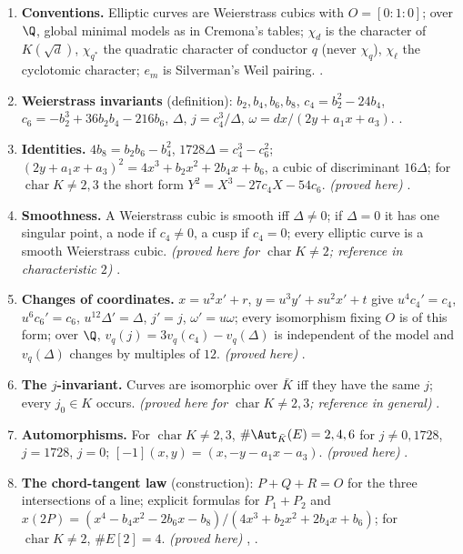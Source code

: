\begin{enumerate}[label=\textbf{\thechapter.\arabic*}]
\item \textbf{Conventions.} Elliptic curves are Weierstrass cubics with $O=[0:1:0]$; over $\Q$, global minimal models as in Cremona's tables; $\chi_d$ is the character of $K(\sqrt d)$,
$\chi_{q^*}$ the quadratic character of conductor $q$ (never $\chi_q$), $\chi_\ell$ the cyclotomic character; $e_m$ is Silverman's Weil pairing. .
\item \textbf{Weierstrass invariants} (definition): $b_2,b_4,b_6,b_8$, $c_4=b_2^2-24b_4$, $c_6=-b_2^3+36b_2b_4-216b_6$, $\Delta$, $j=c_4^3/\Delta$, $\omega=dx/(2y+a_1x+a_3)$.
.
\item \textbf{Identities.} $4b_8=b_2b_6-b_4^2$, $1728\Delta=c_4^3-c_6^2$; $(2y+a_1x+a_3)^2=4x^3+b_2x^2+2b_4x+b_6$, a cubic of discriminant $16\Delta$; for $\operatorname{char}K\ne2,3$ the short form
$Y^2=X^3-27c_4X-54c_6$. \emph{(proved here)} .
\item \textbf{Smoothness.} A Weierstrass cubic is smooth iff $\Delta\ne0$; if $\Delta=0$ it has one singular point, a node if $c_4\ne0$, a cusp if $c_4=0$; every elliptic curve is a smooth
Weierstrass cubic. \emph{(proved here for $\operatorname{char}K\ne2$; reference in characteristic $2$)} .
\item \textbf{Changes of coordinates.} $x=u^2x'+r$, $y=u^3y'+su^2x'+t$ give $u^4c_4'=c_4$, $u^6c_6'=c_6$, $u^{12}\Delta'=\Delta$, $j'=j$, $\omega'=u\omega$; every isomorphism fixing $O$ is of this form; over $\Q$,
$v_q(j)=3v_q(c_4)-v_q(\Delta)$ is independent of the model and $v_q(\Delta)$ changes by multiples of $12$. \emph{(proved here)} .
\item \textbf{The $j$-invariant.} Curves are isomorphic over $\bar K$ iff they have the same $j$; every $j_0\in K$ occurs. \emph{(proved here for $\operatorname{char}K\ne2,3$; reference in general)}
.
\item \textbf{Automorphisms.} For $\operatorname{char}K\ne2,3$, $\#\Aut_{\bar K}(E)=2,4,6$ for $j\ne0,1728$, $j=1728$, $j=0$; $[-1](x,y)=(x,-y-a_1x-a_3)$. \emph{(proved here)} .
\item \textbf{The chord-tangent law} (construction): $P+Q+R=O$ for the three intersections of a line; explicit formulas for $P_1+P_2$ and $x(2P)=(x^4-b_4x^2-2b_6x-b_8)/(4x^3+b_2x^2+2b_4x+b_6)$; for
$\operatorname{char}K\ne2$, $\#E[2]=4$. \emph{(proved here)} , .

\end{enumerate}
